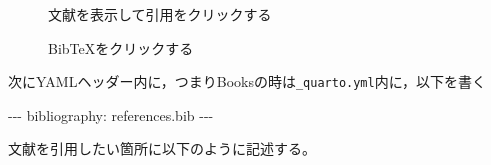 \documentclass[
  b5paper,
  xelatex, ja=standard]{bxjsbook}
\newenvironment{Shaded}{\begin{snugshade}}{\end{snugshade}}
\newcommand{\AttributeTok}[1]{\textcolor[rgb]{0.40,0.45,0.13}{#1}}
\newcommand{\FunctionTok}[1]{\textcolor[rgb]{0.28,0.35,0.67}{#1}}
\newcommand{\KeywordTok}[1]{\textcolor[rgb]{0.00,0.23,0.31}{#1}}
\newcommand{\PreprocessorTok}[1]{\textcolor[rgb]{0.68,0.00,0.00}{#1}}
\begin{document}
\begin{figure}


\caption{\label{fig-gscholar}文献を表示して引用をクリックする}

\end{figure}%

\begin{figure}


\caption{\label{fig-gscholar-cite}BibTeXをクリックする}

\end{figure}%

次にYAMLヘッダー内に，つまりBooksの時は\texttt{\_quarto.yml}内に，以下を書く

\begin{Shaded}
\begin{Highlighting}[]
\PreprocessorTok{{-}{-}{-}}
\FunctionTok{bibliography}\KeywordTok{:}\AttributeTok{ references.bib}
\PreprocessorTok{{-}{-}{-}}
\end{Highlighting}
\end{Shaded}

文献を引用したい箇所に以下のように記述する。
\end{document}
